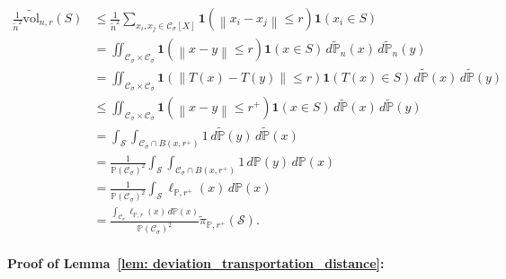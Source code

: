 \documentclass[11pt,twoside]{article}
\newcommand{\vol}{\mathrm{vol}}
\newcommand{\norm}[1]{\left\lVert#1\right\rVert}
\newcommand{\1}{\mathbf{1}}
\newcommand{\Xbf}{X}             %
\newcommand{\Pbb}{\mathbb{P}}
\newcommand{\Sset}{\mathcal{S}}
\newcommand{\Cset}{\mathcal{C}}
\newcommand{\Csig}{\Cset_{\sigma}}
\newcommand{\piwt}{\widetilde{\pi}}
\begin{document}
\begin{align}
\frac{1}{\widetilde{n}^2} \widetilde{\vol}_{n,r}(S) & \leq \frac{1}{ \widetilde{n}^2} \sum_{x_i, x_j \in \Csig[\Xbf]} \1(\norm{x_i - x_j} \leq r) \1(x_i \in S) \nonumber \\
& = \iint_{\Csig \times \Csig} \1(\norm{x - y} \leq r) \1(x \in S) \,d\widetilde{\Pbb}_n(x) \,d\widetilde{\Pbb}_n(y) \nonumber \\
& = \iint_{\Csig \times \Csig} \1(\norm{T(x) - T(y)} \leq r) \1(T(x) \in S) \,d\widetilde{\Pbb}(x) \,d\widetilde{\Pbb}(y) \nonumber \\
& \leq \iint_{\Csig \times \Csig} \1(\norm{x - y} \leq r^+) \1(x \in S) \,d\widetilde{\Pbb}(x) \,d\widetilde{\Pbb}(y) \nonumber \\
& = \int_{\Sset} \int_{\Csig \cap B(x,r^+)} 1 \,d\widetilde{\Pbb}(y) \,d\widetilde{\Pbb}(x) \nonumber \\
& = \frac{1}{\Pbb(\Csig)^2}\int_{\Sset} \int_{\Csig \cap B(x,r^+)} 1 \,d\Pbb(y) \,d\Pbb(x) \nonumber \\
& = \frac{1}{\Pbb(\Csig)^2}\int_{\Sset} \ell_{\Pbb,r^+}(x) \,d\Pbb(x) \nonumber \\
& = \frac{\int_{\Csig} \ell_{\Pbb,r}(x) \,d\Pbb(x)}{\Pbb(\Csig)^2} \piwt_{\Pbb,r^+}(\Sset). \label{eqn: vol_bound}
\end{align}

\paragraph{Proof of Lemma~\ref{lem: deviation_transportation_distance}: }
\end{document}
